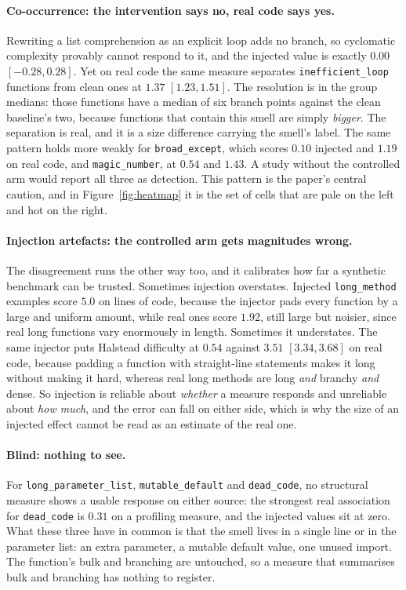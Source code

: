 \documentclass[10pt,a4paper,twocolumn]{article}
\begin{document}
\paragraph{Co-occurrence: the intervention says no, real code says yes.}
Rewriting a list comprehension as an explicit loop adds no branch, so cyclomatic
complexity provably cannot respond to it, and the injected value is exactly
$0.00$ $[-0.28, 0.28]$. Yet on real code the same measure separates \texttt{inefficient\_loop}
functions from clean ones at $1.37$ $[1.23, 1.51]$. The resolution is in the
group medians: those functions have a median of six branch points against the
clean baseline's two, because
functions that contain this smell are simply \emph{bigger}. The separation is
real, and it is a size difference carrying the smell's label. The same pattern
holds more weakly for \texttt{broad\_except}, which scores $0.10$ injected and
$1.19$ on real code, and \texttt{magic\_number}, at $0.54$ and $1.43$. A study
without the controlled arm would report all three as detection. This pattern is
the paper's central caution, and in Figure~\ref{fig:heatmap} it is the set of
cells that are pale on the left and hot on the right.

\paragraph{Injection artefacts: the controlled arm gets magnitudes wrong.} The
disagreement runs the other way too, and it calibrates how far a synthetic
benchmark can be trusted. Sometimes injection overstates. Injected \texttt{long\_method} examples score $5.0$ on lines of code, because
the injector pads every function by a large and uniform amount, while real ones
score $1.92$, still large but noisier,
since real long functions vary enormously in length. Sometimes it understates.
The same injector puts Halstead difficulty at $0.54$ against $3.51$ $[3.34, 3.68]$ on real code,
because padding a function with straight-line statements makes it long without
making it hard, whereas real long methods are long \emph{and} branchy \emph{and}
dense. So injection is reliable about \emph{whether} a measure responds and
unreliable about \emph{how much}, and the error can fall on either side, which
is why the size of an injected effect cannot be read as an estimate of the real
one.

\paragraph{Blind: nothing to see.} For \texttt{long\_parameter\_list},
\texttt{mutable\_default} and \texttt{dead\_code}, no structural measure shows a usable response on either source: the strongest
real association for \texttt{dead\_code} is $0.31$ on a profiling measure, and the injected values sit at zero. What these
three have in common is that the smell lives in a single line or in the
parameter list: an extra parameter, a mutable default value, one unused import.
The function's bulk and branching are untouched, so a measure that summarises
bulk and branching has nothing to register.
\end{document}
